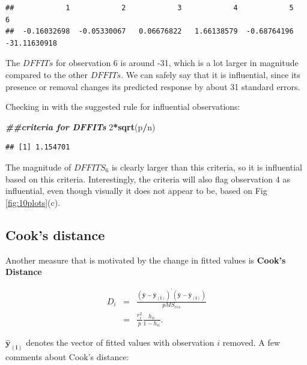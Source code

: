 \documentclass[
]{book}
\newenvironment{Shaded}{\begin{snugshade}}{\end{snugshade}}
\newcommand{\DecValTok}[1]{\textcolor[rgb]{0.00,0.00,0.81}{#1}}
\newcommand{\DocumentationTok}[1]{\textcolor[rgb]{0.56,0.35,0.01}{\textbf{\textit{#1}}}}
\newcommand{\FunctionTok}[1]{\textcolor[rgb]{0.13,0.29,0.53}{\textbf{#1}}}
\newcommand{\NormalTok}[1]{#1}
\newcommand{\SpecialCharTok}[1]{\textcolor[rgb]{0.81,0.36,0.00}{\textbf{#1}}}
\begin{document}
\begin{verbatim}
##            1            2            3            4            5            6 
##  -0.16032698  -0.05330067   0.06676822   1.66138579  -0.68764196 -31.11630918
\end{verbatim}

The \(DFFITs\) for observation 6 is around -31, which is a lot larger in magnitude compared to the other \(DFFITs\). We can safely say that it is influential, since its presence or removal changes its predicted response by about 31 standard errors.

Checking in with the suggested rule for influential observations:

\begin{Shaded}
\begin{Highlighting}[]
\DocumentationTok{\#\#criteria for DFFITs}
\DecValTok{2}\SpecialCharTok{*}\FunctionTok{sqrt}\NormalTok{(p}\SpecialCharTok{/}\NormalTok{n)}
\end{Highlighting}
\end{Shaded}

\begin{verbatim}
## [1] 1.154701
\end{verbatim}

The magnitude of \(DFFITS_6\) is clearly larger than this criteria, so it is influential based on this criteria. Interestingly, the criteria will also flag observation 4 as influential, even though visually it does not appear to be, based on Fig \ref{fig:10plots}(c).

\hypertarget{cooks-distance}{%
\subsection{Cook's distance}\label{cooks-distance}}

Another measure that is motivated by the change in fitted values is \textbf{Cook's Distance}

\begin{eqnarray}
D_i &=& \frac{\left( \boldsymbol{\hat{y}} - \boldsymbol{\hat{y}_{(i)}} \right)^{\prime} \left( \boldsymbol{\hat{y}} - \boldsymbol{\hat{y}_{(i)}} \right)}{p MS_{res}} \label{eq:10cooks1} \\
    &=& \frac{r_i^2}{p}\frac{h_{ii}}{1-h_{ii}}. \label{eq:10cooks2}
\end{eqnarray}

\(\boldsymbol{\hat{y}_{(i)}}\) denotes the vector of fitted values with observation \(i\) removed. A few comments about Cook's distance:
\end{document}
